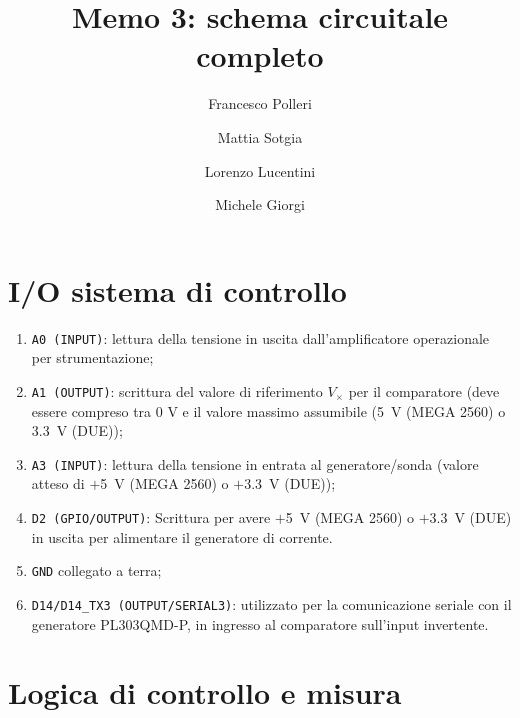 \documentclass[fleqn,varvw,preprintnumbers,citeautoscript]{memo}
\begin{document}
\title{Memo 3: schema circuitale completo}

\author{Francesco Polleri}
\author{Mattia Sotgia}


\author{Lorenzo Lucentini}
\author{Michele Giorgi}

\revised{\today}

\begin{abstract}

\end{abstract}
\maketitle

\section{I/O sistema di controllo}

\begin{enumerate}
    \item \verb-A0 (INPUT)-: lettura della tensione in uscita dall'amplificatore operazionale per strumentazione;
    \item \verb-A1 (OUTPUT)-: scrittura del valore di riferimento $V_\times$ per il comparatore (deve essere compreso tra 0 V e il valore massimo assumibile (\SI{5}{\volt} (MEGA 2560) o \SI{3.3}{\volt} (DUE));
    \item \verb-A3 (INPUT)-: lettura della tensione in entrata al generatore/sonda (valore atteso di $+$\SI{5}{\volt} (MEGA 2560) o $+$\SI{3.3}{\volt} (DUE));
    \item \verb-D2 (GPIO/OUTPUT)-: Scrittura per avere $+$\SI{5}{\volt} (MEGA 2560) o $+$\SI{3.3}{\volt} (DUE) in uscita per alimentare il generatore di corrente.
    \item \verb-GND- collegato a terra;
    \item \verb-D14/D14_TX3 (OUTPUT/SERIAL3)-: utilizzato per la comunicazione seriale con il generatore PL303QMD-P, in ingresso al comparatore sull'input invertente. 
\end{enumerate}

\section{Logica di controllo e misura}
\end{document}
